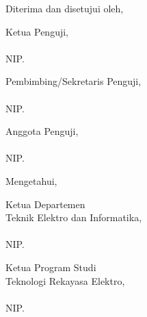 \begin{center}
    Diterima dan disetujui oleh,
\end{center}
  \begin{minipage}{0.45\textwidth}
    Ketua Penguji,\\[2cm]\underline{\ketuapenguji}\\
    NIP. \NIPketuapenguji
\end{minipage}
\hfill
\begin{minipage}{0.45\textwidth}
    Pembimbing/Sekretaris Penguji,\\[2cm]
    \underline{\pembimbing}\\
    NIP. \NIPpembimbing
\end{minipage}%
\begin{center}
    \centering
    \begin{minipage}{0.45\textwidth}
    Anggota Penguji,\\[2cm]
    \underline{\anggotapenguji}\\
    NIP. \NIPanggotapenguji
\end{minipage}%
\end{center}
\begin{center}
    Mengetahui,
\end{center}
\begin{minipage}{0.5\textwidth}
    Ketua Departemen\\
    Teknik Elektro dan Informatika,\\[2.5cm]
    \underline{\koordepartemen}\\
    NIP. \NIPkadep
\end{minipage}
\hfill
\begin{minipage}{0.45\textwidth}
    Ketua Program Studi\\
    Teknologi Rekayasa
    Elektro,\\[2.5cm]
    \underline{\koorprodi}\\
    NIP. \NIPKaprodi
\end{minipage}%